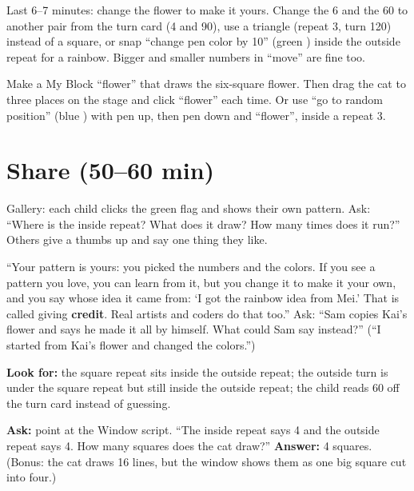 \begin{freebuild}
Last 6--7 minutes: change the flower to make it yours. Change the 6 and the 60 to another pair from the turn card (4 and 90), use a triangle (repeat 3, turn 120) instead of a square, or snap \enquote{change pen color by 10} (green ) inside the outside repeat for a rainbow. Bigger and smaller numbers in \enquote{move} are fine too.
\end{freebuild}

\begin{stretchchallenge}
Make a My Block \enquote{flower} that draws the six-square flower. Then drag the cat to three places on the stage and click \enquote{flower} each time. Or use \enquote{go to random position} (blue ) with pen up, then pen down and \enquote{flower}, inside a repeat 3.
\end{stretchchallenge}

\section{Share (50--60 min)}
\begin{teacherscript}
Gallery: each child clicks the green flag and shows their own pattern. Ask: \enquote{Where is the inside repeat? What does it draw? How many times does it run?} Others give a thumbs up and say one thing they like.
\end{teacherscript}

\begin{safety}
\enquote{Your pattern is yours: you picked the numbers and the colors. If you see a pattern you love, you can learn from it, but you change it to make it your own, and you say whose idea it came from: \enquote{I got the rainbow idea from Mei.} That is called giving \textbf{credit}. Real artists and coders do that too.} Ask: \enquote{Sam copies Kai's flower and says he made it all by himself. What could Sam say instead?} (\enquote{I started from Kai's flower and changed the colors.})
\end{safety}

\begin{formativecheck}
\textbf{Look for:} the square repeat sits inside the outside repeat; the outside turn is under the square repeat but still inside the outside repeat; the child reads 60 off the turn card instead of guessing.

\textbf{Ask:} point at the Window script. \enquote{The inside repeat says 4 and the outside repeat says 4. How many squares does the cat draw?}
\textbf{Answer:} 4 squares. (Bonus: the cat draws 16 lines, but the window shows them as one big square cut into four.)
\end{formativecheck}

